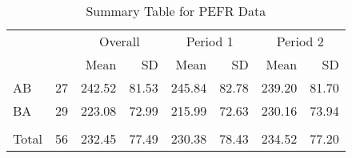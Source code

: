 \begin{table}

\caption{\label{tab:pefrDataSummary}Summary Table for PEFR Data}
\centering
\begin{tabular}[t]{l>{}r|rrrrrr}
\toprule
\multicolumn{2}{c}{ } & \multicolumn{2}{c}{Overall} & \multicolumn{2}{c}{Period 1} & \multicolumn{2}{c}{Period 2} \\
\cmidrule(l{3pt}r{3pt}){3-4} \cmidrule(l{3pt}r{3pt}){5-6} \cmidrule(l{3pt}r{3pt}){7-8}
 &  & Mean & SD & Mean & SD & Mean & SD\\
\midrule
AB & 27 & 242.52 & 81.53 & 245.84 & 82.78 & 239.20 & 81.70\\
BA & 29 & 223.08 & 72.99 & 215.99 & 72.63 & 230.16 & 73.94\\
\midrule\\
Total & 56 & 232.45 & 77.49 & 230.38 & 78.43 & 234.52 & 77.20\\
\bottomrule
\end{tabular}
\end{table}
